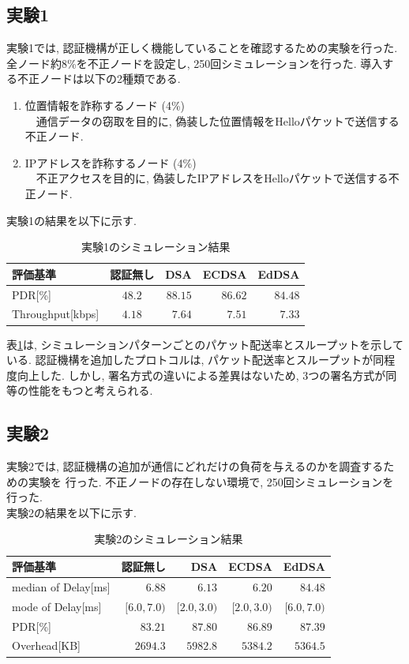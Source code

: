 \documentclass[a4j,9pt,twocolumn]{jsarticle}
\begin{document}
\subsection{実験1}
実験1では, 認証機構が正しく機能していることを確認するための実験を行った. 
全ノード約8\%を不正ノードを設定し, 250回シミュレーションを行った. 
導入する不正ノードは以下の2種類である. 
\begin{enumerate}
    \item 位置情報を詐称するノード (4\%)\\
    \indent 　通信データの窃取を目的に, 偽装した位置情報をHelloパケットで送信する不正ノード. 
    \item IPアドレスを詐称するノード (4\%)\\
    \indent 　不正アクセスを目的に, 偽装したIPアドレスをHelloパケットで送信する不正ノード. 
\end{enumerate}
実験1の結果を以下に示す.
\begin{table}[h]
    \centering
    \caption{実験1のシミュレーション結果}
    \label{tab:exp1} 
    \begin{tabular}{l|crrr} \hline
        評価基準 & 認証無し & DSA & ECDSA & EdDSA \\ \hline \hline
        PDR[\%] & $48.2$ & $88.15$ & $86.62$ & $84.48$ \\
        Throughput[kbps] & $4.18$ & $7.64$ & $7.51$ & $7.33$ \\ \hline
    \end{tabular}
\end{table}

表\ref{tab:exp1}は, シミュレーションパターンごとのパケット配送率とスループットを示している. 
認証機構を追加したプロトコルは, パケット配送率とスループットが同程度向上した. 
しかし, 署名方式の違いによる差異はないため, 3つの署名方式が同等の性能をもつと考えられる. 

\subsection{実験2}
\indent 実験2では, 認証機構の追加が通信にどれだけの負荷を与えるのかを調査するための実験を
行った. 不正ノードの存在しない環境で, 250回シミュレーションを行った. \\
\indent 実験2の結果を以下に示す. 
\vspace{-3mm}
\begin{table}[h]
    \centering
    \caption{実験2のシミュレーション結果}
    \label{tab:exp2} 
    \begin{tabular}{l|rrrr} \hline
        評価基準 & 認証無し & DSA & ECDSA & EdDSA \\ \hline \hline
        \footnotesize{median of Delay[ms]} & $6.88$ & $6.13$ & $6.20$ & $84.48$ \\
        \small{mode of Delay[ms]} & $[6.0, 7.0)$ & $[2.0, 3.0)$ & $[2.0, 3.0)$ & $[6.0, 7.0)$ \\
        PDR[\%] & $83.21$ & $87.80$ & $86.89$ & $87.39$ \\
        Overhead[KB] & $2694.3$ & $5982.8$ & $5384.2$ & $5364.5$ \\ \hline
    \end{tabular}
\end{table}
\end{document}
